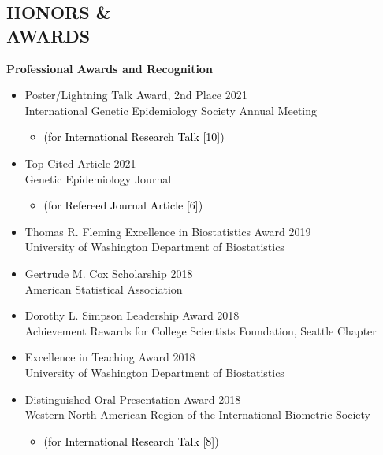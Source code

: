 \documentclass[margin]{res}
\newcommand{\annotateItem}[1]{
	\begin{itemize} \vspace{-0.1cm}
	\item[] 
	\begin{footnotesize}\textcolor{black}{(#1)}\end{footnotesize}
	\end{itemize} \vspace{-0.1cm}
}
\begin{document}
\begin{resume}
\section{HONORS \& \\ AWARDS}

\textbf{Professional Awards and Recognition}
\begin{itemize}

\item Poster/Lightning Talk Award, 2nd Place   \hfill 2021 \\
International Genetic Epidemiology Society Annual Meeting
	\annotateItem{for International Research Talk [10]}

\item Top Cited Article  \hfill 2021 \\
Genetic Epidemiology Journal
	\annotateItem{for Refereed Journal Article [6]}

\item Thomas R. Fleming Excellence in Biostatistics Award \hfill 2019 \\   
University of Washington Department of Biostatistics

\item Gertrude M. Cox Scholarship \hfill 2018 \\ American Statistical Association

\item Dorothy L. Simpson Leadership Award \hfill 2018 \\ Achievement Rewards for College Scientists Foundation, Seattle Chapter

\item Excellence in Teaching Award  \hfill 2018 \\
University of Washington Department of Biostatistics

\item Distinguished Oral Presentation Award  \hfill 2018 \\ Western North American Region of the International Biometric Society  %
	\annotateItem{for International Research Talk [8]}


\end{itemize}
\end{resume}
\end{document}
